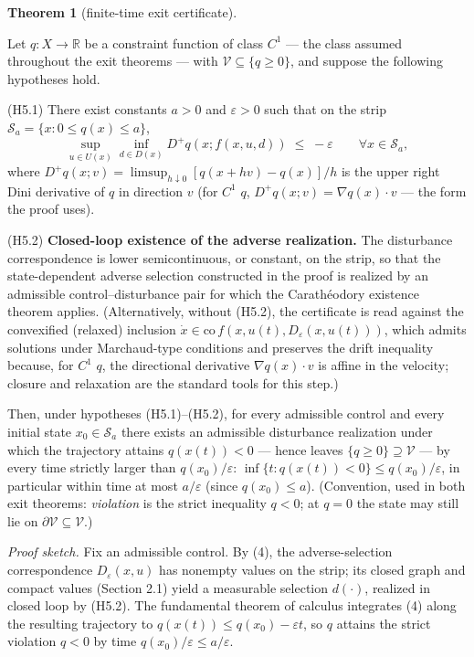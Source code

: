 \documentclass[10pt,twocolumn]{article}
\theoremstyle{definition}
\newtheorem{theorem}{Theorem}
\begin{document}
\begin{theorem}[finite-time exit certificate]\label{thm:exit}

Let \(q : X \to \mathbb{R}\) be a constraint function of class \(C^1\) --- the class assumed throughout the exit theorems --- with
\(\mathcal{V} \subseteq \{ q \ge 0 \}\), and suppose the following
hypotheses hold.

(H5.1) There exist constants \(a > 0\) and \(\varepsilon > 0\) such that
on the strip \(\mathcal{S}_a = \{ x : 0 \le q(x) \le a \}\),
\[\sup_{u \in U(x)} \inf_{d \in D(x)} D^+ q(x; f(x,u,d)) \;\le\; -\varepsilon \qquad \forall x \in \mathcal{S}_a, \tag{4}\]
where \(D^+ q(x; v) = \limsup_{h \downarrow 0} [q(x + hv) - q(x)]/h\) is
the upper right Dini derivative of \(q\) in direction \(v\) (for \(C^1\)
\(q\), \(D^+ q(x; v) = \nabla q(x) \cdot v\) --- the form the proof
uses).

(H5.2) \textbf{Closed-loop existence of the adverse realization.} The
disturbance correspondence is lower semicontinuous, or constant, on the
strip, so that the state-dependent adverse selection constructed in the
proof is realized by an admissible control--disturbance pair for which
the Carath\'eodory existence theorem applies. (Alternatively, without (H5.2), the certificate is read against the convexified (relaxed) inclusion
\(\dot x \in \mathrm{co}\, f(x, u(t), D_{\varepsilon}(x, u(t)))\), which
admits solutions under Marchaud-type conditions and preserves the drift
inequality because, for \(C^1\) \(q\), the directional derivative
\(\nabla q(x)\cdot v\) is affine in the velocity; closure and
relaxation are the standard tools for this step.)

Then, under hypotheses (H5.1)--(H5.2), for every
admissible control and every initial state \(x_0 \in \mathcal{S}_a\)
there exists an admissible disturbance realization under which the
trajectory attains \(q(x(t)) < 0\) --- hence leaves
\(\{ q \ge 0 \} \supseteq \mathcal{V}\) --- by every time strictly
larger than \(q(x_0)/\varepsilon\):
\(\inf\{ t : q(x(t)) < 0 \} \le q(x_0)/\varepsilon\), in particular
within time at most \(a/\varepsilon\) (since \(q(x_0) \le a\)).
(Convention, used in both exit theorems: \emph{violation} is the strict
inequality \(q < 0\); at \(q = 0\) the state may still lie on
\(\partial \mathcal{V} \subseteq \mathcal{V}\).)

\end{theorem}

\emph{Proof sketch.} Fix an admissible control. By (4), the adverse-selection correspondence \(D_\varepsilon(x,u)\) has nonempty values on the strip; its closed graph and compact values (Section 2.1) yield a measurable selection \(d(\cdot)\), realized in closed loop by (H5.2). The fundamental theorem of calculus integrates (4) along the resulting trajectory to \(q(x(t)) \le q(x_0) - \varepsilon t\), so \(q\) attains the strict violation \(q < 0\) by time \(q(x_0)/\varepsilon \le a/\varepsilon\).
\end{document}
